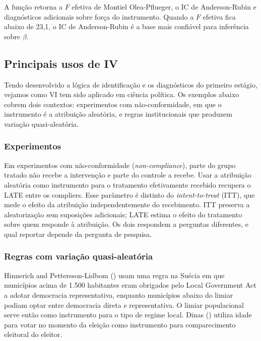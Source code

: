 \documentclass[
]{article}
\begin{document}
A função retorna a \(F\) efetiva de Montiel Olea-Pflueger, o IC de Anderson-Rubin e diagnósticos adicionais sobre força do instrumento. Quando a \(F\) efetiva fica abaixo de 23,1, o IC de Anderson-Rubin é a base mais confiável para inferência sobre \(\beta\).

\subsection{Principais usos de IV}\label{principais-usos-de-iv}

Tendo desenvolvido a lógica de identificação e os diagnósticos do primeiro estágio, vejamos como VI tem sido aplicado em ciência política. Os exemplos abaixo cobrem dois contextos: experimentos com não-conformidade, em que o instrumento é a atribuição aleatória, e regras institucionais que produzem variação quasi-aleatória.

\subsubsection{Experimentos}\label{experimentos-1}

Em experimentos com não-conformidade (\emph{non-compliance}), parte do grupo tratado não recebe a intervenção e parte do controle a recebe. Usar a atribuição aleatória como instrumento para o tratamento efetivamente recebido recupera o LATE entre os compliers. Esse parâmetro é distinto do \emph{intent-to-treat} (ITT), que mede o efeito da atribuição independentemente do recebimento. ITT preserva a aleatorização sem suposições adicionais; LATE estima o efeito do tratamento sobre quem responde à atribuição. Os dois respondem a perguntas diferentes, e qual reportar depende da pergunta de pesquisa.

\subsubsection{Regras com variação quasi-aleatória}\label{regras-com-variauxe7uxe3o-quasi-aleatuxf3ria}

Hinnerich and Pettersson-Lidbom () usam uma regra na Suécia em que municípios acima de 1.500 habitantes eram obrigados pelo Local Government Act a adotar democracia representativa, enquanto municípios abaixo do limiar podiam optar entre democracia direta e representativa. O limiar populacional serve então como instrumento para o tipo de regime local. Dinas () utiliza idade para votar no momento da eleição como instrumento para comparecimento eleitoral do eleitor.
\end{document}
